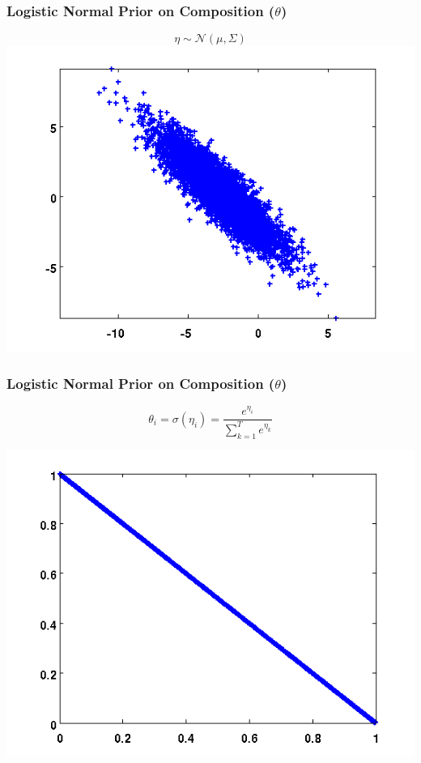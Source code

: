 \documentclass{beamer}
\begin{document}
\begin{frame}
  \frametitle{Logistic Normal Prior on Composition ($\theta$)}
  \begin{center}
    \vspace{-0.4in}
    \begin{equation*}
      \eta \sim \mathcal{N}(\mu, \Sigma)
    \end{equation*}
    \includegraphics[scale=0.6]{img/log-normal-figs/normal-2.png}
  \end{center}
\end{frame}

\begin{frame}
  \frametitle{Logistic Normal Prior on Composition ($\theta$)}
  \begin{center}
    \vspace{-0.3in}
    \begin{equation*}
      \theta_i = \sigma(\eta_i) = \frac{e^{\eta_i}}{\sum_{k=1}^{T}e^{\eta_k}}
    \end{equation*}

    \includegraphics[scale=0.5]{img/log-normal-figs/log-normal-2.png}
  \end{center}
\end{frame}
\end{document}
